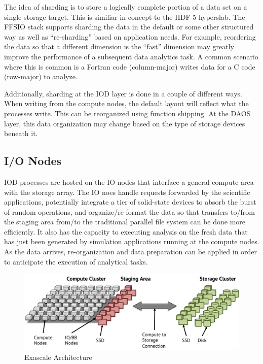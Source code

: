 \documentclass[conference]{IEEEtran}
\begin{document}
The idea of sharding is to store a logically complete portion of a data set on
a single storage target. This is similiar in concept to the HDF-5 hyperslab.
The FFSIO stack supports sharding the data in the default or some other
structured way as well as ``re-sharding'' based on application needs. For
example, reordering the data so that a different dimension is the ``fast''
dimension may greatly improve the performance of a subsequent data analytics
task. A common scenario where this is common is a Fortran code (column-major)
writes data for a C code (row-major) to analyze.

Additionally, sharding at the IOD layer is done in a couple of different ways.
When writing from the compute nodes, the default layout will reflect what the
processes write. This can be reorganized using function shipping. At the DAOS
layer, this data organization may change based on the type of storage devices
beneath it. 

\subsection{I/O Nodes}
IOD processes are hosted on the IO nodes that interface a general compute area
with the storage array. The IO noes handle requests forwarded by the scientific
applications, potentially integrate a tier of solid-state devices to absorb the
burst of random operations, and organize/re-format the data so that transfers
to/from the staging area from/to the traditional parallel file system can be
done more efficiently. It also has the capacity to executing analysis on the
fresh data that has just been generated by simulation applications running at
the compute nodes. As the data arrives, re-organization and data preparation
can be applied in order to anticipate the execution of analytical tasks.

\begin{figure}[htbp]
\centering
\includegraphics[width=\columnwidth]{images/exa-arch.png}
\caption{Exascale Architecture}
\label{fig:exa-arch}
\end{figure}
\end{document}

